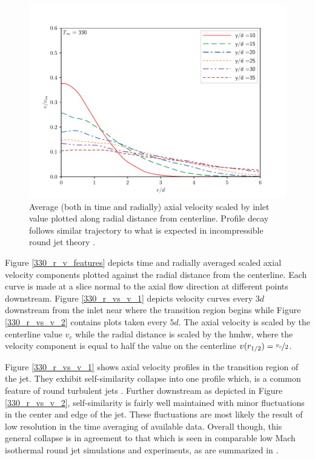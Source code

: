 \begin{figure}[htbp!]
\begin{center}
	\includegraphics[scale=.7]{figures/Plots/radial/slices_5/same_ambient/ur_u_in_vs_r_d.pdf}
	\caption{Average (both in time and radially) axial velocity scaled by inlet value plotted along radial distance from centerline. Profile decay follows similar trajectory to what is expected in incompressible round jet theory \cite{Pope}.} \label{330_centerline_decay}
\end{center}
\end{figure}

Figure \ref{330_r_v_features} depicts time and radially averaged scaled axial velocity components plotted against the radial distance from the centerline. Each curve is made at a slice normal to the axial flow direction at different points downstream. Figure \ref{330_r_vs_v_1} depicts velocity curves every $3d$ downstream from the inlet near where the transition region begins while Figure \ref{330_r_vs_v_2} contains plots taken every $5d$. The axial velocity is scaled by the centerline value $v_c$ while the radial distance is scaled by the \gls{hmhw}, where the velocity component is equal to half the value on the centerline $v(r_{1/2}) = \nicefrac{v_c}{2}$.

Figure \ref{330_r_vs_v_1} shows axial velocity profiles in the transition region of the jet. They exhibit self-similarity collapse into one profile which, is a common feature of round turbulent jets \cite{Pope, iso_comp_1, iso_comp_2}. Further downstream as depicted in Figure \ref{330_r_vs_v_2}, self-similarity is fairly well maintained with minor fluctuations in the center and edge of the jet. These fluctuations are most likely the result of low resolution in the time averaging of available data. Overall though, this general collapse is in agreement to that which is seen in comparable low Mach isothermal round jet simulations and experiments, as are summarized in \cite{iso_comp_1}. 

